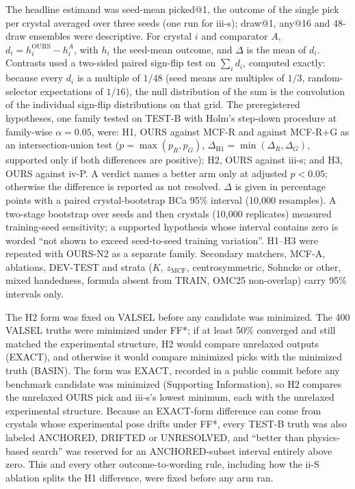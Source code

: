The headline estimand was seed-mean picked@1, the outcome of the single pick per
crystal averaged over three seeds (one run for iii-s); draw@1, any@16 and
48-draw ensembles were descriptive. For crystal $i$ and comparator $A$,
$d_i=h_i^{\mathrm{OURS}}-h_i^{A}$, with $h_i$ the seed-mean outcome, and $\Delta$
is the mean of $d_i$. Contrasts used a two-sided paired sign-flip test on
$\sum_i d_i$, computed exactly: because every $d_i$ is a multiple of $1/48$ (seed means
are multiples of $1/3$, random-selector expectations of $1/16$), the null distribution of
the sum is the convolution of the individual sign-flip distributions on that grid. The
preregistered hypotheses, one family tested on
TEST-B with Holm's step-down procedure\cite{holm1979simple} at family-wise
$\alpha=0.05$, were: H1, OURS against MCF-R and against MCF-R+G as an
intersection-union test ($p=\max(p_R,p_G)$, $\Delta_{\mathrm{H1}}=\min(\Delta_R,
\Delta_G)$, supported only if both differences are positive); H2, OURS against
iii-s; and H3, OURS against iv-P. A verdict names a better arm only at adjusted
$p<0.05$; otherwise the difference is reported as not resolved. $\Delta$ is
given in percentage points with a paired crystal-bootstrap BCa 95\%
interval\cite{efron1987better} (10,000 resamples). A two-stage
bootstrap over seeds and then crystals (10,000 replicates) measured training-seed
sensitivity; a supported hypothesis whose interval contains zero is worded ``not
shown to exceed seed-to-seed training variation''. H1--H3 were repeated with
OURS-N2 as a separate family. Secondary matchers, MCF-A, ablations, DEV-TEST and
strata ($K$, $z_{\mathrm{MCF}}$, centrosymmetric, Sohncke or other, mixed
handedness, formula absent from TRAIN, OMC25 non-overlap) carry 95\% intervals
only.

The H2 form was fixed on VALSEL before any candidate was minimized. The 400 VALSEL
truths were minimized under FF*; if at least 50\% converged and still matched the
experimental structure, H2 would compare unrelaxed outputs (EXACT), and otherwise it
would compare minimized picks with the minimized truth (BASIN). The form was EXACT,
recorded in a public commit before any benchmark candidate was minimized (Supporting
Information), so H2 compares the unrelaxed OURS pick and iii-s's lowest minimum, each with
the unrelaxed experimental structure. Because an EXACT-form difference can come from
crystals whose experimental pose drifts under FF*, every TEST-B truth was also labeled
ANCHORED, DRIFTED or UNRESOLVED, and ``better than physics-based search'' was
reserved for an ANCHORED-subset interval entirely above zero. This and every other
outcome-to-wording rule, including how the ii-S ablation splits the H1 difference,
were fixed before any arm ran.


